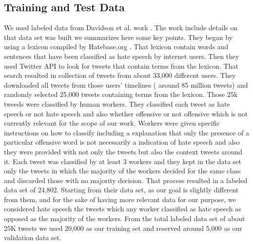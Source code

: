 \documentclass[conference]{sig-alternate-05-2015}
\begin{document}
\subsection{Training and Test Data}
We used labeled data from  Davidson et al. work \cite{Davidsonetal.}. The work include details on that data  set was built we summarizes here some key points. They began by using a lexicon compiled by Hatebase.org \cite{HaeBaseOrg}. That lexicon contain words and sentences that have been classified as hate speech by internet users. Then they used Twitter API to look for tweets that contain terms from the lexicon. That search resulted in collection of tweets from about 33,000 different users. They downloaded all tweets from those users' timelines ( around 85 million tweets) and randomly selected 25,000 tweets containing terms from the lexicon. Those 25k tweeds were classified by human workers. They classified each tweet as hate speech or not hate speech and also whether offensive or not offensive which is not currently relevant for the scope of our work. Workers were given specific instructions on how to classify including a explanation that only the presence of a particular offensive word is not necessarily a indication of hate speech and also they were provided with not only the tweets but also the context tweets around it. Each tweet was classified by at least 3 workers and they kept in the data set only the tweets in which the majority of the workers decided for the same class and discarded those with no majority decision.  That process resulted in a labeled data set of 24,802.
Starting from their data set, as our goal is slightly different from them, and for the sake of having more relevant data for our purpose,  we considered hate speech the tweets which any worker classified as hate speech as opposed as the majority of the workers. 
From the total labeled data set of about 25K tweets we used 20,000 as our training set and reserved around 5,000 as our validation data set.
\end{document}
